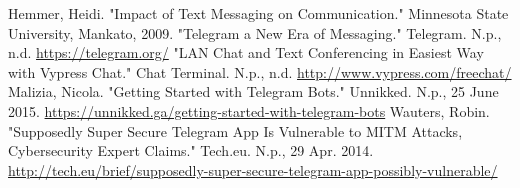 \documentclass[twoside]{article}
\begin{document}
\begin{multicols}{2}
\begin{thebibliography}{99} %
Hemmer, Heidi. "Impact of Text Messaging on Communication." Minnesota State University, Mankato, 2009.
"Telegram  a New Era of Messaging." Telegram. N.p., n.d.  \href{https://telegram.org/}{https://telegram.org/}
"LAN Chat and Text Conferencing in Easiest Way with Vypress Chat." Chat Terminal. N.p., n.d.  \href{http://www.vypress.com/free\textunderscore chat/}{http://www.vypress.com/free\textunderscore chat/}
Malizia, Nicola. "Getting Started with Telegram Bots." Unnikked. N.p., 25 June 2015. \href{https://unnikked.ga/getting-started-with-telegram-bots}{https://unnikked.ga/getting-started-with-telegram-bots}
Wauters, Robin. "Supposedly Super Secure Telegram App Is Vulnerable to MITM Attacks, Cybersecurity Expert Claims." Tech.eu. N.p., 29 Apr. 2014.  \href{http://tech.eu/brief/supposedly-super-secure-telegram-app-possibly-vulnerable/}{http://tech.eu/brief/supposedly-super-secure-telegram-app-possibly-vulnerable/} 

\end{thebibliography}


\end{multicols}
\end{document}
